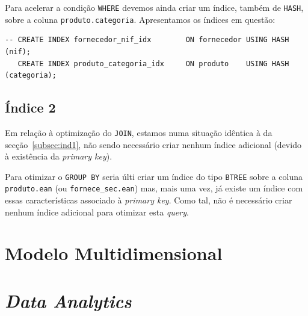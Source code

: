 \documentclass[a4paper]{article}
\begin{document}
    Para acelerar a condição \lstinline{WHERE} devemos ainda criar um índice, também de \lstinline{HASH}, sobre
    a coluna \lstinline{produto.categoria}. Apresentamos os índices em questão:

    \begin{lstlisting}
-- CREATE INDEX fornecedor_nif_idx        ON fornecedor USING HASH (nif);
   CREATE INDEX produto_categoria_idx     ON produto    USING HASH  (categoria);
    \end{lstlisting}

    \subsection{Índice 2}
    Em relação à optimização do \lstinline{JOIN}, estamos numa situação idêntica à da secção~\ref{subsec:ind1}, não
    sendo necessário criar nenhum índice adicional (devido à existência da \textit{primary key}).


    Para otimizar o \lstinline{GROUP BY} seria últi criar um índice do tipo \lstinline{BTREE} sobre a coluna
    \lstinline{produto.ean} (ou \lstinline{fornece_sec.ean}) mas, mais uma vez, já existe um índice com essas
    características associado à \textit{primary key}. Como tal, não é necessário criar nenhum índice adicional
    para otimizar esta \textit{query}.

    \section{Modelo Multidimensional}
    

    \section{\textit{Data Analytics}}
    
\end{document}
